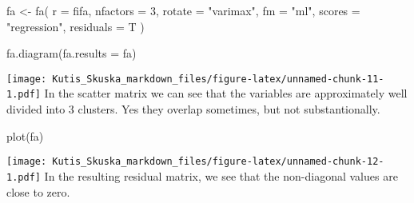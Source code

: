 \documentclass[
]{article}
\newenvironment{Shaded}{\begin{snugshade}}{\end{snugshade}}
\newcommand{\AttributeTok}[1]{\textcolor[rgb]{0.77,0.63,0.00}{#1}}
\newcommand{\DecValTok}[1]{\textcolor[rgb]{0.00,0.00,0.81}{#1}}
\newcommand{\FunctionTok}[1]{\textcolor[rgb]{0.00,0.00,0.00}{#1}}
\newcommand{\NormalTok}[1]{#1}
\newcommand{\OtherTok}[1]{\textcolor[rgb]{0.56,0.35,0.01}{#1}}
\newcommand{\SpecialCharTok}[1]{\textcolor[rgb]{0.00,0.00,0.00}{#1}}
\newcommand{\StringTok}[1]{\textcolor[rgb]{0.31,0.60,0.02}{#1}}
\begin{document}
\begin{Shaded}
\begin{Highlighting}[]
\NormalTok{fa }\OtherTok{\textless{}{-}}
    \FunctionTok{fa}\NormalTok{(}
        \AttributeTok{r =}\NormalTok{ fifa,}
        \AttributeTok{nfactors =} \DecValTok{3}\NormalTok{,}
        \AttributeTok{rotate =} \StringTok{"varimax"}\NormalTok{,}
        \AttributeTok{fm =} \StringTok{"ml"}\NormalTok{,}
        \AttributeTok{scores =} \StringTok{"regression"}\NormalTok{,}
        \AttributeTok{residuals =}\NormalTok{ T}
\NormalTok{    )}

\FunctionTok{fa.diagram}\NormalTok{(}\AttributeTok{fa.results =}\NormalTok{ fa)}
\end{Highlighting}
\end{Shaded}

\texttt{[image: Kutis\_Skuska\_markdown\_files/figure-latex/unnamed-chunk-11-1.pdf]}
In the scatter matrix we can see that the variables are approximately
well divided into 3 clusters. Yes they overlap sometimes, but not
substantionally.

\begin{Shaded}
\begin{Highlighting}[]
\FunctionTok{plot}\NormalTok{(fa)}
\end{Highlighting}
\end{Shaded}

\texttt{[image: Kutis\_Skuska\_markdown\_files/figure-latex/unnamed-chunk-12-1.pdf]}
In the resulting residual matrix, we see that the non-diagonal values
are close to zero.

\begin{Shaded}
\end{Shaded}
\end{document}

